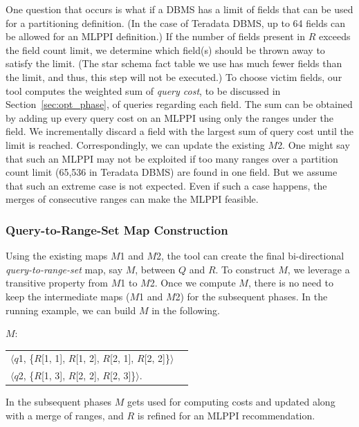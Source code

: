 \documentclass[runningheads]{comsis2}
\begin{document}
One question that occurs is what if a DBMS has 
a limit of fields that can be used for a partitioning definition. 
(In the case of Teradata DBMS, up to 64 fields can be allowed for 
an MLPPI definition.)
If the number of fields present in $R$ exceeds the field count limit, 
we determine which field(s) should be thrown away to satisfy the limit. 
(The star schema fact table we use has much fewer fields than the limit, 
and thus, this step will not be executed.)
To choose victim fields, our tool computes the weighted sum of 
{\em query cost}, to be discussed in Section~\ref{sec:opt_phase}, 
of queries regarding each field. 
The sum can be obtained by adding up every query cost on an MLPPI using 
only the ranges under the field. 
We incrementally discard a field with the largest sum of query cost 
until the limit is reached. 
Correspondingly, we can update the existing $M$2. 
One might say that such an MLPPI may not be exploited if too many ranges 
over a partition count limit (65,536 in Teradata DBMS) are found in one field.
But we assume that such an extreme case is not expected. Even if 
such a case happens, the merges of consecutive ranges can make the MLPPI feasible. 

\subsubsection{Query-to-Range-Set Map Construction}

Using the existing maps $M$1 and $M$2, 
the tool can create the final bi-directional {\em query-to-range-set} map, say $M$, 
between $Q$ and $R$. 
To construct $M$, we leverage a transitive property from $M$1 to $M$2.
Once we compute $M$, there is no need to keep 
the intermediate maps ($M$1 and $M$2) for the subsequent phases. 
In the running example, we can build $M$ in the following. 

\pagebreak

{\it $M$}:
\begin{center}
\begin{tabular}{ll} 
$\langle${$q$1}, \{$R$[1, 1], $R$[1, 2], $R$[2, 1], $R$[2, 2]\}$\rangle$ \\
$\langle${$q$2}, \{$R$[1, 3], $R$[2, 2], $R$[2, 3]\}$\rangle$.
\end{tabular}
\end{center} 
\vspace{-.1in}
\noindent In the subsequent phases $M$ gets used for computing costs and updated 
along with a merge of ranges, and $R$ is refined for an MLPPI recommendation. 
\end{document}
